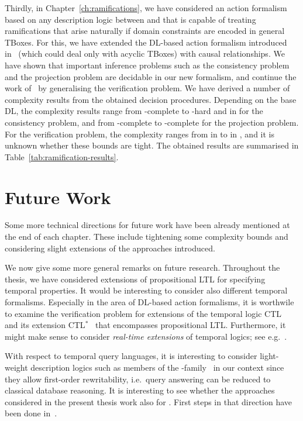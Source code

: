 Thirdly, in Chapter~\ref{ch:ramifications}, we have considered an action
formalism based on any description logic between \ALC and \ALCQIO that is
capable of treating ramifications that arise naturally if domain constraints are
encoded in general TBoxes.  For this, we have extended the DL-based action
formalism introduced in~\cite{BLM+-AAAI05} (which could deal only with acyclic
TBoxes) with causal relationships.  We have shown that important inference
problems such as the consistency problem and the projection problem are
decidable in our new formalism, and continue the work of~\cite{BaLM-ECAI10} by
generalising the verification problem.  We have derived a number of complexity
results from the obtained decision procedures.  Depending on the base DL, the
complexity results range from \PSpace-complete to \coNExpTime-hard and in
\PTimeToNExpTime for the consistency problem, and from \PSpace-complete to
\coNExpTime-complete for the projection problem.  For the verification problem,
the complexity ranges from in \ExpSpace to in \coTwoNExpTime, and it is unknown
whether these bounds are tight.  The obtained results are summarised in
Table~\ref{tab:ramification-results}.


\section{Future Work}\label{sec:future-work}

Some more technical directions for future work have been already mentioned at
the end of each chapter.  These include tightening some complexity bounds and
considering slight extensions of the approaches introduced.

We now give some more general remarks on future research.  Throughout the
thesis, we have considered extensions of propositional LTL for specifying
temporal properties.  It would be interesting to consider also different
temporal formalisms.  Especially in the area of DL-based action formalisms, it
is worthwile to examine the verification problem for extensions of the temporal
logic CTL~\cite{ClEm-LP81} and its extension CTL$^*$~\cite{EmHa-JACM86} that
encompasses propositional LTL\@.  Furthermore, it might make sense to consider
\emph{real-time extensions} of temporal logics; see
e.g.~\cite{Koy-RTS90,AlHe-IC93,AlFH-JACM96,RaSc-JALC99}.

With respect to temporal query languages, it is interesting to consider
light-weight description logics such as members of the
\DLLite-family~\cite{CDL+-AAAI05,ACK+-JAIR09,CDL+-RW09} in our context since
they allow first-order rewritability, i.e.~query answering can be reduced to
classical database reasoning.  It is interesting to see whether the approaches
considered in the present thesis work also for \DLLite.  First steps in that
direction have been done in~\cite{BoLT-FroCoS13,BoLT-DL13,BoLT-LTCS-13-05}.

